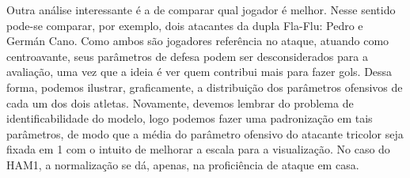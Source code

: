 Outra análise interessante é a de comparar qual jogador é melhor. Nesse sentido pode-se comparar, por exemplo, dois atacantes da dupla Fla-Flu: Pedro e Germán Cano. Como ambos são jogadores referência no ataque, atuando como centroavante, seus parâmetros de defesa podem ser desconsiderados para a avaliação, uma vez que a ideia é ver quem contribui mais para fazer gols. Dessa forma, podemos ilustrar, graficamente, a distribuição dos parâmetros ofensivos de cada um dos dois atletas. Novamente, devemos lembrar do problema de identificabilidade do modelo, logo podemos fazer uma padronização em tais parâmetros, de modo que a média do parâmetro ofensivo do atacante tricolor seja fixada em 1 com o intuito de melhorar a escala para a visualização. No caso do HAM1, a normalização se dá, apenas, na proficiência de ataque em casa.
\begin{figure}[H]
    \\

\end{figure}
